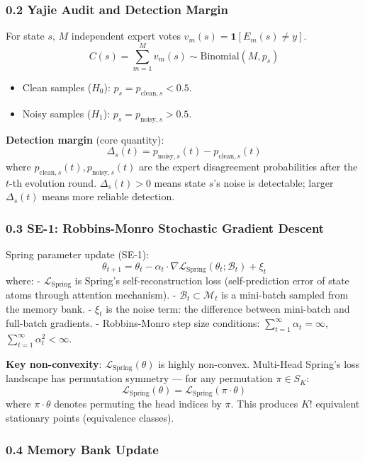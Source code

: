 \documentclass[
  12pt,
]{article}
\providecommand{\tightlist}{%
  \setlength{\itemsep}{0pt}\setlength{\parskip}{0pt}}
\begin{document}
\subsubsection{0.2 Yajie Audit and Detection Margin}\label{yajie-audit-detection-margin}

For state $s$, $M$ independent expert votes $v_m(s) = \mathbf{1}[E_m(s) \neq y]$.
\[C(s) = \sum_{m=1}^{M} v_m(s) \sim \text{Binomial}(M, p_s)\]
\begin{itemize}
\tightlist
\item Clean samples ($H_0$): $p_s = p_{\text{clean},s} < 0.5$.
\item Noisy samples ($H_1$): $p_s = p_{\text{noisy},s} > 0.5$.
\end{itemize}

\textbf{Detection margin} (core quantity):
\[\boxed{\Delta_s(t) = p_{\text{noisy},s}(t) - p_{\text{clean},s}(t)}\]
where $p_{\text{clean},s}(t), p_{\text{noisy},s}(t)$ are the expert disagreement probabilities after the $t$-th evolution round. $\Delta_s(t) > 0$ means state $s$'s noise is detectable; larger $\Delta_s(t)$ means more reliable detection.

\subsubsection{0.3 SE-1: Robbins-Monro Stochastic Gradient Descent}\label{se-1-robbins-monro}

Spring parameter update (SE-1):
\[\theta_{t+1} = \theta_t - \alpha_t \cdot \nabla \mathcal{L}_{\text{Spring}}(\theta_t; \mathcal{B}_t) + \xi_t\]
where:
- $\mathcal{L}_{\text{Spring}}$ is Spring's self-reconstruction loss (self-prediction error of state atoms through attention mechanism).
- $\mathcal{B}_t \subset \mathcal{M}_t$ is a mini-batch sampled from the memory bank.
- $\xi_t$ is the noise term: the difference between mini-batch and full-batch gradients.
- Robbins-Monro step size conditions: $\sum_{t=1}^{\infty} \alpha_t = \infty$, $\sum_{t=1}^{\infty} \alpha_t^2 < \infty$.

\textbf{Key non-convexity}: $\mathcal{L}_{\text{Spring}}(\theta)$ is highly non-convex. Multi-Head Spring's loss landscape has permutation symmetry --- for any permutation $\pi \in S_K$:
\[\mathcal{L}_{\text{Spring}}(\theta) = \mathcal{L}_{\text{Spring}}(\pi \cdot \theta)\]
where $\pi \cdot \theta$ denotes permuting the head indices by $\pi$. This produces $K!$ equivalent stationary points (equivalence classes).

\subsubsection{0.4 Memory Bank Update}\label{memory-bank-update}
\end{document}
